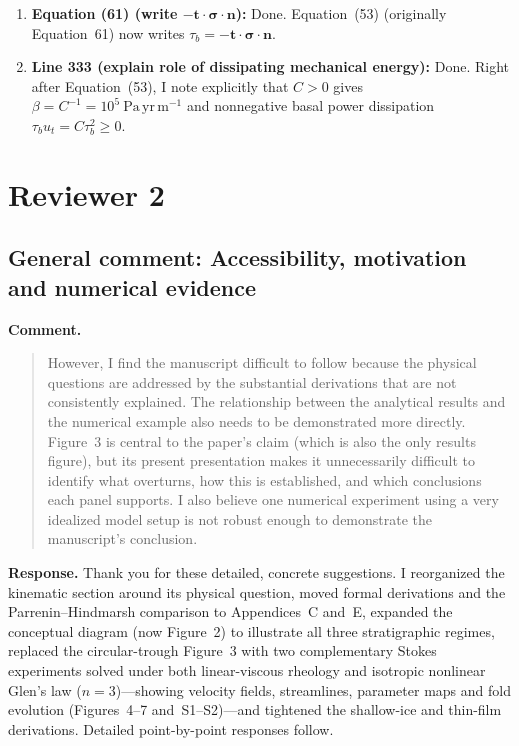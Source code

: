 \documentclass[11pt]{article}
\newcommand{\response}[1]{\noindent\textcolor{responseblue}{#1}}
\begin{document}
\begin{enumerate}
  \item \textbf{Equation (61) (write \(-\bm{t}\cdot\bm{\sigma}\cdot\bm{n}\)):} \textcolor{responseblue}{Done. Equation~(53) (originally Equation~61) now writes \(\tau_b=-\bm{t}\cdot\bm{\sigma}\cdot\bm{n}\).}
  \item \textbf{Line 333 (explain role of dissipating mechanical energy):} \textcolor{responseblue}{Done. Right after Equation~(53), I note explicitly that \(C>0\) gives \(\beta=C^{-1}=10^5~\mathrm{Pa\,yr\,m^{-1}}\) and nonnegative basal power dissipation \(\tau_b u_t=C\tau_b^2\geq0\).}
\end{enumerate}

\section*{Reviewer 2}

\subsection*{General comment: Accessibility, motivation and numerical evidence}

\noindent\textbf{Comment.}
\begin{quote}
However, I find the manuscript difficult to follow because the physical questions are addressed by the substantial derivations that are not consistently explained. The relationship between the analytical results and the numerical example also needs to be demonstrated more directly. Figure~3 is central to the paper's claim (which is also the only results figure), but its present presentation makes it unnecessarily difficult to identify what overturns, how this is established, and which conclusions each panel supports. I also believe one numerical experiment using a very idealized model setup is not robust enough to demonstrate the manuscript's conclusion.
\end{quote}

\response{\textbf{Response.} Thank you for these detailed, concrete suggestions. I reorganized the kinematic section around its physical question, moved formal derivations and the Parrenin--Hindmarsh comparison to Appendices~C and~E, expanded the conceptual diagram (now Figure~2) to illustrate all three stratigraphic regimes, replaced the circular-trough Figure~3 with two complementary Stokes experiments solved under both linear-viscous rheology and isotropic nonlinear Glen's law (\(n=3\))---showing velocity fields, streamlines, parameter maps and fold evolution (Figures~4--7 and~S1--S2)---and tightened the shallow-ice and thin-film derivations. Detailed point-by-point responses follow.}
\end{document}
